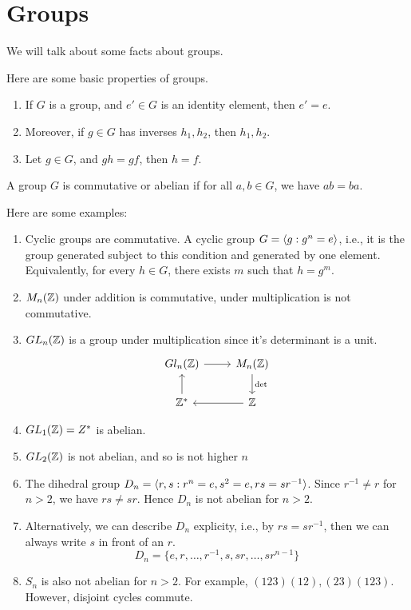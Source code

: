 \chapter{Groups}
We will talk about some facts about groups.
\begin{prop}
    Here are some basic properties of groups.
    \begin{enumerate}
        \item If $G$ is a group, and $e'\in G$ is an identity element, then $e'=e$.
        \item Moreover, if $g\in G$ has inverses $h_1, h_2$, then $h_1, h_2$.
        \item Let $g\in G$, and $gh=gf$, then $h=f$.
    \end{enumerate}
\end{prop}
\begin{defn}[abelian]
    A group $G$ is commutative or abelian if for all $a,b\in G$, we have $ab=ba$.
\end{defn}
Here are some examples:
\begin{enumerate}
    \item Cyclic groups are commutative. A cyclic group $G=\langle g: g^n=e\rangle$, i.e., it is the group generated subject to this condition and generated by one element. Equivalently, for every $h\in G$, there exists $m$ such that $h=g^m$.
    \item $M_n(\mathbb{Z})$ under addition is commutative, under multiplication is not commutative.  
    \item $GL_n(\mathbb{Z})$ is a group under multiplication since it's determinant is a unit. \[\begin{tikzcd}
        {Gl_n(\mathbb{Z})} & {M_n(\mathbb{Z})} \\
        {\mathbb{Z}^*} & {\mathbb{Z}}
        \arrow[from=1-1, to=1-2]
        \arrow["\det", from=1-2, to=2-2]
        \arrow[from=2-1, to=1-1]
        \arrow[from=2-2, to=2-1]
    \end{tikzcd}\]
    \item $GL_1(\mathbb{Z})=Z^*$ is abelian.
    \item $GL_2(\mathbb{Z})$ is not abelian, and so is not higher $n$
    \item The dihedral group $D_n=\langle r,s: r^n=e, s^2=e, rs=sr^{-1}\rangle$. Since $r^{-1}\neq r$ for $n>2$, we have $rs\neq sr$. Hence $D_n$ is not abelian for $n>2$.
    \item Alternatively, we can describe $D_n$ explicity, i.e., by $rs=sr^{-1}$, then we can always write $s$ in front of an $r$.
    \begin{equation*}
        D_n=\{e,r,\ldots, r^{-1}, s, sr, \dots, sr^{n-1}\}
    \end{equation*}
    \item $S_n$ is also not abelian for $n>2$. For example, $(123)(12), (23)(123)$. However, disjoint cycles commute.
\end{enumerate}

